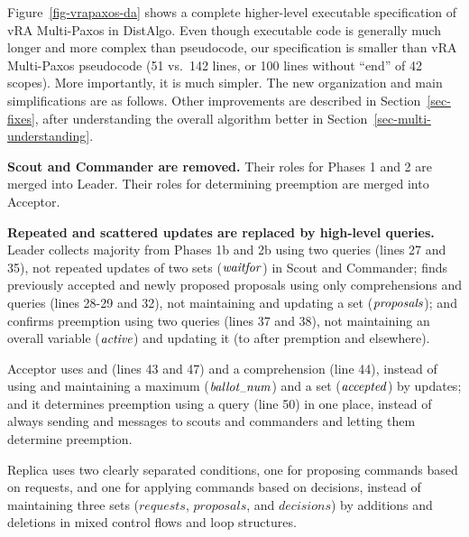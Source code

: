 \documentclass[11pt]{article}
\newcommand\m[1]{\mbox{$#1$}} %
\begin{document}
Figure~\ref{fig-vrapaxos-da} shows a complete higher-level executable
specification of vRA Multi-Paxos in DistAlgo.
Even though executable code is generally much longer and more complex than
pseudocode, our specification is smaller than vRA Multi-Paxos pseudocode
(51 vs.\ 142 lines, or 100 lines without ``end'' of 42 scopes).  More
importantly, it is much simpler.
The new organization and main simplifications are as follows.  Other
improvements are described in Section~\ref{sec-fixes}, after understanding
the overall algorithm better in Section~\ref{sec-multi-understanding}.
\begin{description}
  \icdcs{}
  \setlength{\parskip}{.5ex}

\item {\bf Scout and Commander are removed.}  Their roles for Phases 1 and
  2 are merged into Leader.  Their roles for determining preemption are
  merged into Acceptor.

\item {\bf Repeated and scattered updates are replaced by high-level
    queries.}
  Leader collects majority from Phases 1b and 2b using two 
  queries (lines 27 and 35), not repeated updates of two sets (\m{\it
    waitfor}) in Scout and Commander; finds previously accepted and
  newly proposed proposals using only comprehensions and 
  queries (lines 28-29 and 32), not maintaining and updating a set
  (\m{\it proposals}); and confirms preemption using two 
  queries (lines 37 and 38), not maintaining an overall variable
  (\m{\it active}) and updating it (to  after premption and
   elsewhere).


  Acceptor uses  and  (lines 43 and 47) and a comprehension
  (line 44), instead of using and maintaining a maximum (\m{\it
    ballot{\tiny\_}num}) and a set (\m{\it accepted}) by updates; and it
  determines preemption using a  query (line 50) in one place,
  instead of
  always sending  and  messages to scouts and commanders %
  and letting them determine preemption.
 


  Replica uses two clearly separated conditions, one for proposing
  commands based on requests, and one for applying commands based on
  decisions, instead of maintaining three sets (\m{requests},
  \m{proposals}, and \m{decisions}) by additions and deletions in
  mixed control flows and loop structures.

\end{description}
\end{document}
